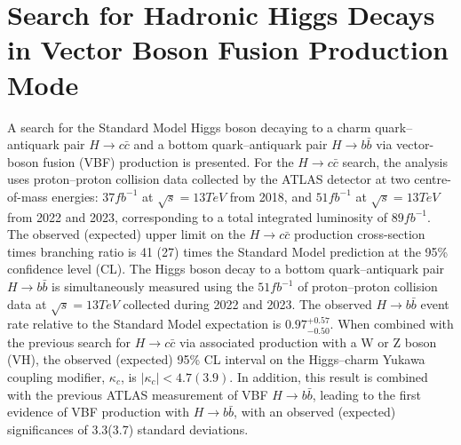 \section{Search for Hadronic Higgs Decays in Vector Boson Fusion Production Mode}

A search for the Standard Model Higgs boson decaying to a charm quark–antiquark pair $H \rightarrow c\bar{c}$ and
a bottom quark–antiquark pair $H \rightarrow b\bar{b}$ via vector-boson fusion (VBF) production is presented. For the
$H \rightarrow c\bar{c}$ search, the analysis uses proton–proton collision data collected by the ATLAS detector at two
centre-of-mass energies: $37 fb^{-1}$ at $\sqrt{s} = 13 TeV$ from 2018, and $51 fb^{-1}$ at $\sqrt{s} = 13 TeV$ from
2022 and 2023, corresponding to a total integrated luminosity of $89 fb^{-1}$. The observed (expected)
upper limit on the $H \rightarrow c\bar{c}$ production cross-section times branching ratio is 41 (27) times the Standard
Model prediction at the 95\% confidence level (CL). The Higgs boson decay to a bottom quark–antiquark
pair $H \rightarrow b\bar{b}$ is simultaneously measured using the $51 fb^{-1}$ of proton–proton collision data at
$\sqrt{s} = 13 TeV$ collected during 2022 and 2023. The observed $H \rightarrow b\bar{b}$ event rate relative to the
Standard Model expectation is $0.97^{+0.57}_{-0.50}$.
When combined with the previous search for $H \rightarrow c\bar{c}$ via
associated production with a W or Z boson (VH), the observed (expected) 95\% CL interval on the
Higgs–charm Yukawa coupling modifier, $\kappa_c$, is $|\kappa_c|<4.7(3.9)$. In addition, this result is combined with
the previous ATLAS measurement of VBF $H \rightarrow b\bar{b}$, leading to the first evidence of VBF production
with $H \rightarrow b\bar{b}$, with an observed (expected) significances of 3.3(3.7) standard deviations.
